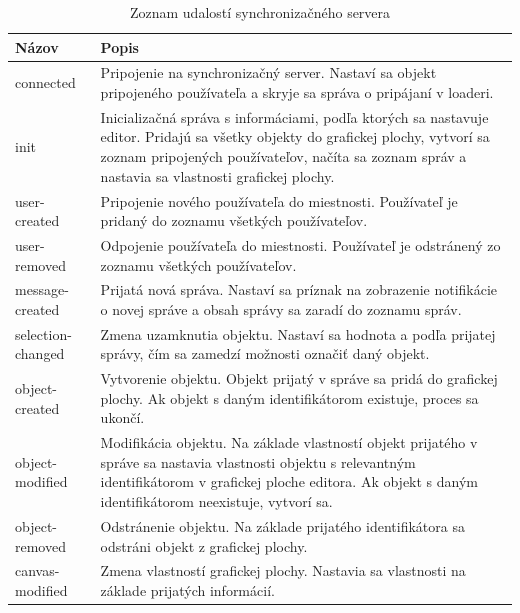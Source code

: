 \begin{table}
	\begin{tabular}{ | m{4cm} | m{8.5cm} | } \hline
		\textbf{Názov} & \textbf{Popis} \\ \hline \hline
		
		connected & Pripojenie na synchronizačný server. Nastaví sa objekt pripojeného používateľa a skryje sa správa o pripájaní v loaderi. \\\hline
		init & Inicializačná správa s informáciami, podľa ktorých sa nastavuje editor. Pridajú sa všetky objekty do grafickej plochy, vytvorí sa zoznam pripojených používateľov, načíta sa zoznam správ a nastavia sa vlastnosti grafickej plochy. \\\hline
		user-created & Pripojenie nového používateľa do miestnosti. Používateľ je pridaný do zoznamu všetkých používateľov. \\\hline
		user-removed & Odpojenie používateľa do miestnosti. Používateľ je odstránený zo zoznamu všetkých používateľov. \\\hline
		message-created & Prijatá nová správa. Nastaví sa príznak na zobrazenie notifikácie o novej správe a obsah správy sa zaradí do zoznamu správ. \\\hline
		selection-changed & Zmena uzamknutia objektu. Nastaví sa hodnota \code{selectable} a \code{selectedBy} podľa prijatej správy, čím sa zamedzí možnosti označiť daný objekt. \\\hline
		object-created & Vytvorenie objektu. Objekt prijatý v správe sa pridá do grafickej plochy. Ak objekt s daným identifikátorom existuje, proces sa ukončí. \\\hline
		object-modified & Modifikácia objektu. Na základe vlastností objekt prijatého v správe sa nastavia vlastnosti objektu s relevantným identifikátorom v grafickej ploche editora. Ak objekt s daným identifikátorom neexistuje, vytvorí sa. \\\hline
		object-removed & Odstránenie objektu. Na základe prijatého identifikátora sa odstráni objekt z grafickej plochy. \\\hline
 		canvas-modified & Zmena vlastností grafickej plochy. Nastavia sa vlastnosti na základe prijatých informácií. \\\hline
		   
		\hline
	\end{tabular}
	\caption{Zoznam udalostí synchronizačného servera}
\label{tab:server-events}
\end{table}
